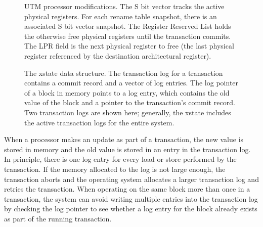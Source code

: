 \begin{figure}[b]
\hspace{-0.15cm}

\caption[UTM processor modifications.]%
{UTM processor modifications. The S bit vector
tracks the active physical registers.  For each rename table snapshot,
there is an associated S bit vector snapshot.  The Register Reserved
List holds the otherwise free physical registers until the transaction
commits.  The LPR field is the next physical register to free (the
last physical register referenced by the destination architectural
register).}
\label{fig:snapshot}
\end{figure}
\begin{figure}[b]
\hspace{-1.3cm} %

\caption[The xstate data structure.]{The xstate data structure.
The transaction log for a transaction contains a commit record and a
vector of log entries.  The log pointer of a block in memory
points to a log entry, which contains the old value of the block and a
pointer to the transaction's commit record.  Two transaction logs
are shown here; generally, the xstate includes the active
transaction logs for the entire system.}
\label{fig:datastruct-entry}
\end{figure}


When a processor makes an update as part of a transaction, the new
value is stored in memory and the old value is stored in an entry in
the transaction log.  In principle, there is one log entry for every
load or store performed by the transaction.  If the memory allocated
to the log  is not large enough, the
transaction aborts and the operating system allocates a larger
transaction log and retries the transaction.  When
operating on the same block more than once in a transaction, the
system can avoid writing multiple entries into the transaction log by
checking the log pointer to see whether a log entry for the block
already exists as part of the running transaction.

